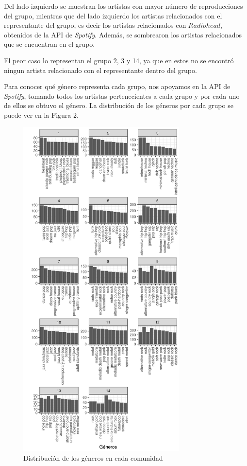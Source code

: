 \documentclass[conference]{IEEEtran}
\begin{document}
Del lado izquierdo se muestran los artistas con mayor número de reproducciones del grupo, mientras que del lado izquierdo los artistas relacionados con el representante del grupo, es decir  los artistas relacionados con $Radiohead$, obtenidos de la API de \textit{Spotify}. Además, se sombrearon los artistas relacionados que se encuentran en el grupo. 

El peor caso lo representan el grupo 2, 3 y 14, ya que en estos no se encontró ningun artista relacionado con el representante dentro del grupo.

Para conocer qué género representa cada grupo, nos apoyamos en la API de \textit{Spotify}, tomando todos los artistas pertenecientes a cada 
grupo y por cada uno de ellos se obtuvo el género. La distribución de los géneros por cada grupo se puede ver en la Figura 2. 

\begin{figure}[h]
    \centering
    \label{fig:dist_generos}
    \caption{Distribución de los géneros en cada comunidad}
    \includegraphics[width=8.5cm]{generos_plot_2.png}
\end{figure}

\printbibliography
\nocite{*}
\end{document}
